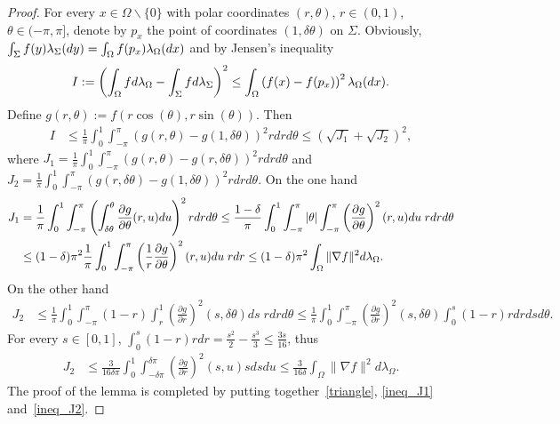 \documentclass[a4paper]{article}
\theoremstyle{definition}
\numberwithin{equation}{section}
\begin{document}
\begin{proof}
For every $x \in \Omega\backslash \{0\}$ with polar coordinates $(r, \theta)$, $r \in (0,1)$, $\theta \in (-\pi,\pi]$, denote by $p_x$ the point of coordinates $(1, \delta \theta)$ on $\Sigma$. Obviously, $\int_{\Sigma} f(y)  \lambda_\Sigma (dy)= \int_\Omega f(p_x)  \lambda_\Omega (dx)$ and by Jensen's inequality
\begin{align*}
I:=\left( \int_\Omega f d \lambda_\Omega - \int_{\Sigma} f d \lambda_\Sigma \right)^2
\leq  \int_\Omega \left(f(x) -f(p_x)\right)^2  \lambda_\Omega (dx).
\end{align*}
Define $g(r, \theta):=f(r \cos(\theta), r \sin (\theta))$. Then
\begin{align}
\label{triangle}
I &\leq \frac{1}{\pi} \int_0^1 \int_{-\pi}^\pi (g(r, \theta)-g(1,\delta \theta))^2 r dr d\theta \leq  ( \sqrt{J_1} +  \sqrt{J_2})^2 ,
\end{align}
where $J_1=\frac{1}{\pi} \int_0^1 \int_{-\pi}^\pi (g(r, \theta)-g(r,\delta \theta))^2 r dr d\theta$ and $J_2=\frac{1}{\pi} \int_0^1 \int_{-\pi}^\pi (g(r, \delta\theta)-g(1,\delta \theta))^2 r dr d\theta$. 
On the one hand
\begin{align}
J_1 &= \frac{1}{\pi} \int_0^1 \int_{-\pi}^\pi \left(\int_{\delta \theta} ^\theta \frac{\partial g}{\partial \theta} (r,u) du\right)^2 r dr d\theta \leq \frac{1-\delta}{\pi} \int_0^1 \int_{-\pi}^\pi |\theta| \int_{-\pi}^\pi  \left(\frac{\partial g}{\partial \theta} \right)^2(r,u) du \; r dr d\theta \notag\\
&\leq (1-\delta)\pi^2  \frac{1}{\pi}\int_0^1  \int_{-\pi}^\pi  \left(\frac{1}{r}\frac{\partial g}{\partial \theta} \right)^2(r,u) du \; r dr 
\leq (1-\delta)\pi^2 \int_\Omega \| \nabla f \|^2 d\lambda_\Omega.
\label{ineq_J1}
\end{align}
On the other hand
\begin{align*}
J_2 
&\leq \frac{1}{\pi} \int_0^1 \int_{-\pi}^\pi (1-r)  \int_r ^1 \left(\frac{\partial g}{\partial r}\right)^2 (s,\delta \theta) ds \; r dr d\theta \leq \frac{1}{\pi} \int_0^1 \int_{-\pi}^\pi  \left(\frac{\partial g}{\partial r}\right)^2 (s,\delta \theta) \int_0^s (1-r) r dr ds d\theta.
\end{align*}
For every $s \in [0,1]$, 
$\int_0^s (1-r) r dr = \frac{s^2}{2}-\frac{s^3}{3}\leq \frac{3s}{16}$, thus
\begin{align}
J_2
&\leq \frac{3}{16\delta \pi} \int_0^1 \int_{-\delta \pi}^{\delta\pi}  \left(\frac{\partial g}{\partial r}\right)^2 (s,u) s ds du \leq \frac{3}{16\delta} \int_\Omega \| \nabla f \|^2 d\lambda_\Omega.
\label{ineq_J2}
\end{align}
The proof of the lemma is completed by putting together~\eqref{triangle}, \eqref{ineq_J1} and~\eqref{ineq_J2}.
\end{proof}
\end{document}
